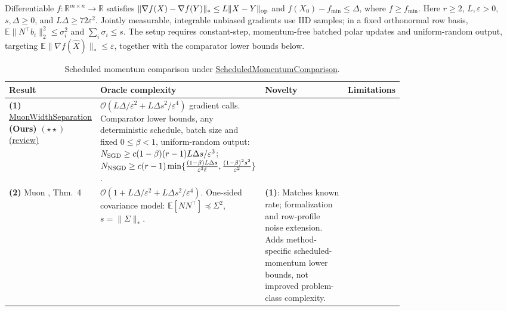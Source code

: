 \begin{table}[tp]
\centering
\caption{Scheduled momentum comparison under \href{https://github.com/k3nfalt/longtails/blob/main/LongTails/Setups/ScheduledMomentumComparison.lean}{ScheduledMomentumComparison}.}\label{tab:ScheduledMomentumComparison}
\parbox{\linewidth}{\footnotesize Differentiable $f:\mathbb R^{m\times n}\to\mathbb R$ satisfies $\|\nabla f(X)-\nabla f(Y)\|_*\le L\|X-Y\|_{\rm op}$ and $f(X_0)-f_{\min}\le\Delta$, where $f\ge f_{\min}$. Here $r\ge2$, $L,\varepsilon>0$, $s,\Delta\ge0$, and $L\Delta\ge72\varepsilon^2$. Jointly measurable, integrable unbiased gradients use IID samples; in a fixed orthonormal row basis, $\mathbb E\|N^\top b_i\|_2^2\le\sigma_i^2$ and $\sum_i\sigma_i\le s$. The setup requires constant-step, momentum-free batched polar updates and uniform-random output, targeting $\mathbb E\|\nabla f(\widehat X)\|_*\le\varepsilon$, together with the comparator lower bounds below.}\par\smallskip
\begin{threeparttable}
\footnotesize
\setlength{\tabcolsep}{4pt}\renewcommand{\arraystretch}{1.25}
\begin{tabularx}{\linewidth}{@{}>{\raggedright\arraybackslash}p{0.20\linewidth}>{\raggedright\arraybackslash}p{0.32\linewidth}>{\raggedright\arraybackslash}p{0.25\linewidth}>{\raggedright\arraybackslash}X@{}}
\toprule
\textbf{Result} & \textbf{Oracle complexity} & \textbf{Novelty} & \textbf{Limitations} \\
\midrule
\textbf{(1)} \href{https://github.com/k3nfalt/longtails/blob/main/LongTails/Theorems/MuonWidthSeparation.lean}{Muon\allowbreak Width\allowbreak Separation} \textbf{(Ours)} $(\star\star)$ \href{https://github.com/k3nfalt/longtails/blob/main/scripts/reviews/MuonWidthSeparation.md}{(review)} &
$\mathcal{O}(L\Delta/\varepsilon^2+L\Delta s^2/\varepsilon^4)$ gradient calls.
Comparator lower bounds, any deterministic schedule, batch size and fixed $0\le\beta<1$, uniform-random output:
$N_{\rm SGD}\ge c(1-\beta)(r-1)L\Delta s/\varepsilon^3$;
$N_{\rm NSGD}\ge c(r-1)\min\{\frac{(1-\beta)L\Delta s}{\varepsilon^3\ell},\frac{(1-\beta)^2s^2}{\varepsilon^2}\}$.
& & \\
\midrule[1.2pt]
\textbf{(2)} Muon \citep{smcTYZ2026v1}, Thm.~4 &
$\mathcal{O}(1+L\Delta/\varepsilon^2+L\Delta s^2/\varepsilon^4)$.
One-sided covariance model: $\mathbb E[NN^\top]\preceq\Sigma^2$, $s=\|\Sigma\|_*$. &
\textbf{(1)}: Matches known rate; formalization and row-profile noise extension. Adds method-specific scheduled-momentum lower bounds, not improved problem-class complexity. &

\end{tabularx}
\end{threeparttable}
\end{table}
